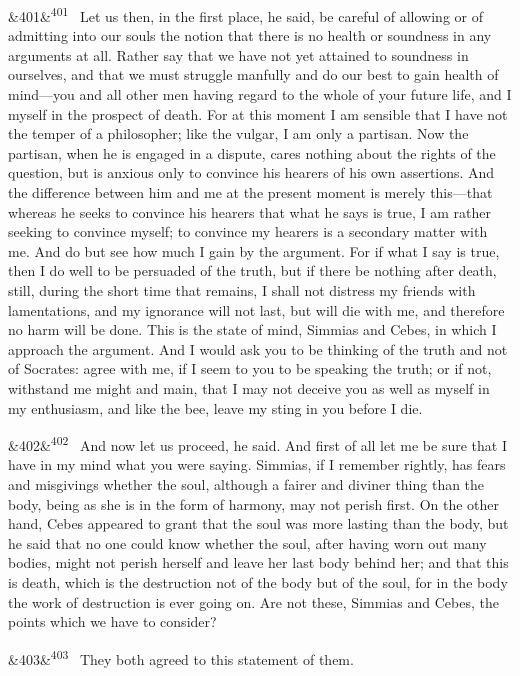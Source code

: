 \documentclass[12pt]{article}
\newcommand{\para}[1][]{\par\noindent\ifx&#1&\else\textsuperscript{\footnotesize #1}~\fi}
\begin{document}
\para[401] Let us then, in the first place, he said, be careful of allowing or of admitting into our souls the notion that there is no health or soundness in any arguments at all. Rather say that we have not yet attained to soundness in ourselves, and that we must struggle manfully and do our best to gain health of mind---you and all other men having regard to the whole of your future life, and I myself in the prospect of death. For at this moment I am sensible that I have not the temper of a philosopher; like the vulgar, I am only a partisan. Now the partisan, when he is engaged in a dispute, cares nothing about the rights of the question, but is anxious only to convince his hearers of his own assertions. And the difference between him and me at the present moment is merely this---that whereas he seeks to convince his hearers that what he says is true, I am rather seeking to convince myself; to convince my hearers is a secondary matter with me. And do but see how much I gain by the argument. For if what I say is true, then I do well to be persuaded of the truth, but if there be nothing after death, still, during the short time that remains, I shall not distress my friends with lamentations, and my ignorance will not last, but will die with me, and therefore no harm will be done. This is the state of mind, Simmias and Cebes, in which I approach the argument. And I would ask you to be thinking of the truth and not of Socrates: agree with me, if I seem to you to be speaking the truth; or if not, withstand me might and main, that I may not deceive you as well as myself in my enthusiasm, and like the bee, leave my sting in you before I die.

\para[402] And now let us proceed, he said. And first of all let me be sure that I have in my mind what you were saying. Simmias, if I remember rightly, has fears and misgivings whether the soul, although a fairer and diviner thing than the body, being as she is in the form of harmony, may not perish first. On the other hand, Cebes appeared to grant that the soul was more lasting than the body, but he said that no one could know whether the soul, after having worn out many bodies, might not perish herself and leave her last body behind her; and that this is death, which is the destruction not of the body but of the soul, for in the body the work of destruction is ever going on. Are not these, Simmias and Cebes, the points which we have to consider?

\para[403] They both agreed to this statement of them.
\end{document}
